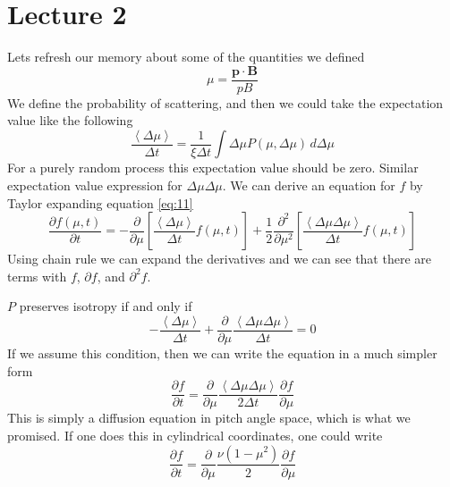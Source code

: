 \documentclass[letterpaper, 11pt]{article}
\numberwithin{equation}{section}
\numberwithin{figure}{section}
\begin{document}
\section{Lecture 2}

Lets refresh our memory about some of the quantities we defined
\begin{equation}
  \label{eq:12}
  \mu = \frac{\mathbf{p}\cdot \mathbf{B}}{pB}
\end{equation}
We define the probability of scattering, and then we could take the expectation
value like the following
\begin{equation}
  \label{eq:13}
  \frac{\left\langle \Delta \mu \right\rangle}{\Delta t} = \frac{1}{\xi \Delta t}\int \Delta\mu P(\mu, \Delta\mu)\,d\Delta\mu
\end{equation}
For a purely random process this expectation value should be zero. Similar
expectation value expression for $\Delta\mu\Delta\mu$. We can derive an equation
for $f$ by Taylor expanding equation \eqref{eq:11}
\begin{equation}
  \label{eq:14}
  \frac{\partial f(\mu, t)}{\partial t} = -\frac{\partial}{\partial \mu}\left[ \frac{\left\langle \Delta\mu \right\rangle}{\Delta t}f(\mu, t) \right] + \frac{1}{2}\frac{\partial^2}{\partial\mu^2}\left[ \frac{\left\langle \Delta\mu\Delta\mu \right\rangle}{\Delta t}f(\mu, t) \right]
\end{equation}
Using chain rule we can expand the derivatives and we can see that there are
terms with $f$, $\partial f$, and $\partial^2f$.

$P$ preserves isotropy if and only if
\begin{equation}
  \label{eq:15}
  -\frac{\left\langle \Delta\mu \right\rangle}{\Delta t} + \frac{\partial}{\partial\mu}\frac{\left\langle \Delta\mu\Delta\mu \right\rangle}{\Delta t} = 0
\end{equation}
If we assume this condition, then we can write the equation in a much simpler
form
\begin{equation}
  \label{eq:16}
  \frac{\partial f}{\partial t} = \frac{\partial}{\partial \mu}\frac{\left\langle \Delta\mu\Delta\mu \right\rangle}{2\Delta t}\frac{\partial f}{\partial \mu}
\end{equation}
This is simply a diffusion equation in pitch angle space, which is what we
promised. If one does this in cylindrical coordinates, one could write
\begin{equation}
  \label{eq:17}
  \frac{\partial f}{\partial t} = \frac{\partial}{\partial\mu}\frac{\nu(1 - \mu^2)}{2}\frac{\partial f}{\partial \mu}
\end{equation}
\end{document}
